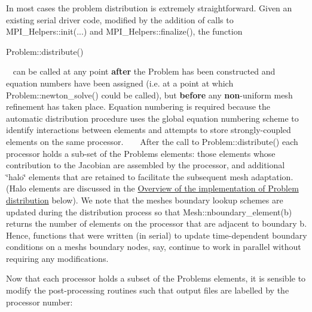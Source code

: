 \begin{DoxyItemize}
\item In most cases the problem distribution is extremely straightforward. Given an existing serial driver code, modified by the addition of calls to {\ttfamily M\+P\+I\+\_\+\+Helpers\+::init}(...) and {\ttfamily M\+P\+I\+\_\+\+Helpers\+::finalize()}, the function ~\newline
~\newline

\begin{DoxyCode}
Problem::distribute()
\end{DoxyCode}
 ~\newline
 can be called at any point {\bfseries after} the {\ttfamily Problem} has been constructed and equation numbers have been assigned (i.\+e. at a point at which {\ttfamily Problem\+::newton\+\_\+solve()} could be called), but {\bfseries before} any {\bfseries non}-\/uniform mesh refinement has taken place. Equation numbering is required because the automatic distribution procedure uses the global equation numbering scheme to identify interactions between elements and attempts to store strongly-\/coupled elements on the same processor. ~\newline
~\newline
 After the call to {\ttfamily Problem\+::distribute()} each processor holds a sub-\/set of the {\ttfamily Problem\textquotesingle{}s} elements\+: those elements whose contribution to the Jacobian are assembled by the processor, and additional \char`\"{}halo\char`\"{} elements that are retained to facilitate the subsequent mesh adaptation. (Halo elements are discussed in the \hyperlink{index_how_it_works}{Overview of the implementation of Problem distribution} below). We note that the meshes\textquotesingle{} boundary lookup schemes are updated during the distribution process so that {\ttfamily Mesh\+::nboundary\+\_\+element(b)} returns the number of elements on the processor that are adjacent to boundary {\ttfamily b}. Hence, functions that were written (in serial) to update time-\/dependent boundary conditions on a mesh\textquotesingle{}s boundary nodes, say, continue to work in parallel without requiring any modifications. ~\newline
~\newline

\item Now that each processor holds a subset of the {\ttfamily Problem\textquotesingle{}s} elements, it is sensible to modify the post-\/processing routines such that output files are labelled by the processor number\+: ~\newline
~\newline
  

\end{DoxyItemize}
